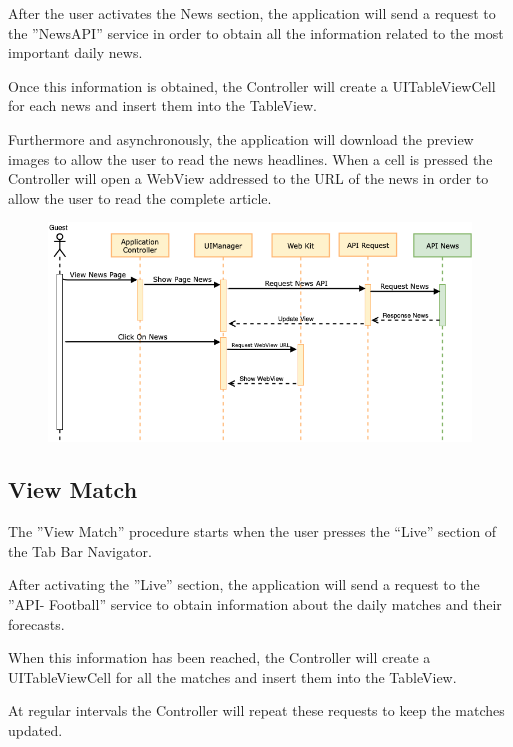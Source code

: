 \documentclass[numbers=noenddot, 12pt, a4paper, oneside]{scrbook}
\begin{document}
After the user activates the News section, the application will send a request to the ”NewsAPI” service in order to obtain all the information related to the most important daily news.

Once this information is obtained, the Controller will create a UITableViewCell for each news and insert them into the TableView.

Furthermore and asynchronously, the application will download the preview images to allow the user to read the news headlines. When a cell is pressed the Controller will open a WebView addressed to the URL of the news in order to allow the user to read  the complete article.

\begin{figure}[H]
	\centering
	\includegraphics[width=1\textwidth]{images/Sequence/SequenceNews}
\end{figure}


\newpage
\subsection*{View Match}
The ”View Match” procedure starts when the user presses the “Live” section of the Tab Bar Navigator.

After activating the ”Live” section, the application will send a request to the ”API- Football” service to obtain information about the daily matches and their forecasts.

When this information has been reached, the Controller will create a UITableViewCell for all the matches and insert them into the TableView.

At regular intervals the Controller will repeat these requests to keep the matches updated.
\end{document}
